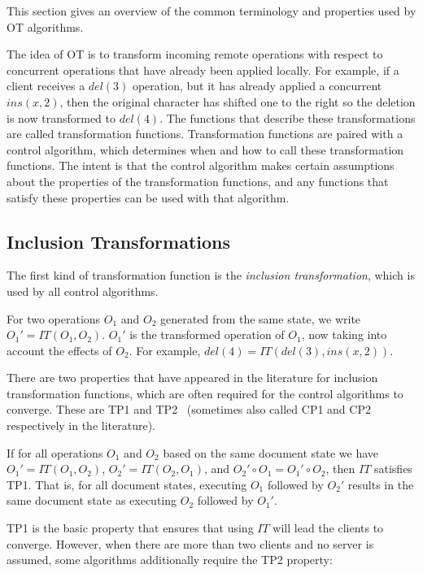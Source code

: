 \documentclass[sigplan,10pt,review,anonymous]{acmart}
\begin{document}
This section gives an overview of the common terminology and properties used by OT algorithms.

The idea of OT is to transform incoming remote operations with respect to concurrent operations that have already been applied locally. For example, if a client receives a
$del(3)$ operation, but it has already applied a concurrent $ins(x,2)$, then the original character has shifted one to the right so the deletion is now transformed to $del(4)$. The functions
that describe these transformations are called transformation functions. Transformation functions are paired with a control algorithm, which determines when and how to call these 
transformation functions. The intent is that the control algorithm makes certain assumptions about the properties of the transformation functions, and any functions that satisfy these properties
can be used with that algorithm.

\subsection{Inclusion Transformations}


The first kind of transformation function is the \emph{inclusion transformation}, which is used by all control algorithms. 

\begin{definition}
  For two operations $O_1$ and $O_2$ generated from the same state, we write $O_1' = IT(O_1, O_2)$. $O_1'$ is the transformed operation
  of $O_1$, now taking into account the effects of $O_2$. For example, $del(4) = IT(del(3), ins(x, 2))$.
\end{definition}

There are two properties that have appeared in the literature for inclusion transformation functions, which are often required for the control algorithms to converge. These are TP1 and TP2~\cite{Ressel1996} (sometimes also called CP1 and CP2 respectively in the literature).

\begin{property}[TP1]
  If for all operations $O_1$ and $O_2$ based on the same document state we have $O_1' = IT(O_1, O_2)$, $O_2' = IT(O_2, O_1)$, and
  $O_2' \circ O_1 = O_1' \circ O_2$, then $IT$ satisfies TP1. That is, for all document states, executing $O_1$ followed by $O_2'$ results in the same
  document state as executing $O_2$ followed by $O_1'$.
\end{property}

TP1 is the basic property that ensures that using $IT$ will lead the clients to converge. However, when there are more than two clients and no server is assumed, some algorithms additionally require the TP2 property:
\end{document}
